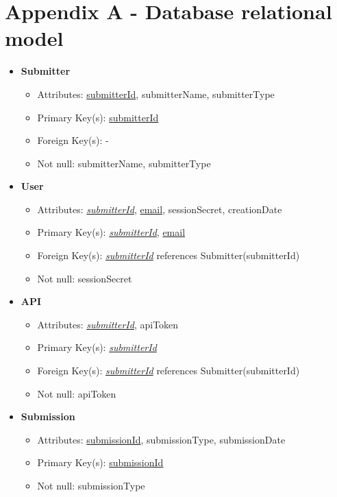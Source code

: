 \section*{Appendix A - Database relational model}
\label{app:relational_model}
    \begin{itemize}
        \item \textbf{Submitter}        
        \begin{itemize}
            \item Attributes: \underline{submitterId}, submitterName, submitterType
            \item Primary Key(s): \underline{submitterId}
            \item Foreign Key(s): -
            \item Not null: submitterName, submitterType
        \end{itemize}

        \item \textbf{User}
        \begin{itemize}
            \item Attributes: \underline{\textit{submitterId}}, \underline{email}, sessionSecret, creationDate
            \item Primary Key(s): \underline{\textit{submitterId}}, \underline{email}
            \item Foreign Key(s): \underline{\textit{submitterId}} references Submitter(submitterId)
            \item Not null: sessionSecret
        \end{itemize}

        \item \textbf{API}
        \begin{itemize}
            \item Attributes: \underline{\textit{submitterId}}, apiToken
            \item Primary Key(s): \underline{\textit{submitterId}}
            \item Foreign Key(s): \underline{\textit{submitterId}} references Submitter(submitterId)
            \item Not null: apiToken
        \end{itemize}

        \item \textbf{Submission}
        \begin{itemize}
            \item Attributes: \underline{submissionId}, submissionType, submissionDate
            \item Primary Key(s): \underline{submissionId}            
            \item Not null: submissionType
        \end{itemize}


\end{itemize}
